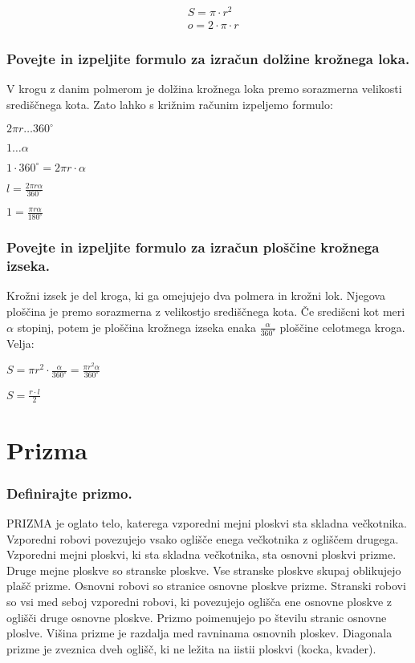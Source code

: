 \documentclass{article}
\begin{document}
$$
\begin{aligned}
& S=\pi \cdot r^{2} \\
& o=2 \cdot \pi \cdot r
\end{aligned}
$$

\subsubsection*{Povejte in izpeljite formulo za izračun dolžine krožnega loka.}

V krogu z danim polmerom je dolžina krožnega loka premo sorazmerna velikosti središčnega kota. Zato lahko s križnim računim izpeljemo formulo:

$2 \pi r \ldots 360^{\circ}$

$1 \ldots \alpha$

$1 \cdot 360^{\circ}=2 \pi r \cdot \alpha$

$l=\frac{2 \pi r \alpha}{360^{\circ}}$

$1=\frac{\pi r \alpha}{180^{\circ}}$

\subsubsection*{Povejte in izpeljite formulo za izračun ploščine krožnega izseka.}

Krožni izsek je del kroga, ki ga omejujejo dva polmera in krožni lok. Njegova ploščina je premo sorazmerna z velikostjo središčnega kota. Če središcni kot meri $\alpha$ stopinj, potem je ploščina krožnega izseka enaka $\frac{\alpha}{360^{\circ}}$ ploščine celotmega kroga. Velja:

$S=\pi r^{2} \cdot \frac{\alpha}{360^{\circ}}=\frac{\pi r^{2} \alpha}{360^{\circ}}$

$S=\frac{r \cdot l}{2}$

\section{Prizma}
\subsubsection*{Definirajte prizmo.}

PRIZMA je oglato telo, katerega vzporedni mejni ploskvi sta skladna večkotnika. Vzporedni robovi povezujejo vsako oglišče enega večkotnika z ogliščem drugega. Vzporedni mejni ploskvi, ki sta skladna večkotnika, sta osnovni ploskvi prizme. Druge mejne ploskve so stranske ploskve. Vse stranske ploskve skupaj oblikujejo plašč prizme. Osnovni robovi so stranice osnovne ploskve prizme. Stranski robovi so vsi med seboj vzporedni robovi, ki povezujejo oglišča ene osnovne ploskve z oglišči druge osnovne ploskve. Prizmo poimenujejo po številu stranic osnovne ploslve. Višina prizme je razdalja med ravninama osnovnih ploskev. Diagonala prizme je zveznica dveh oglišč, ki ne ležita na iistii ploskvi (kocka, kvader).
\end{document}

